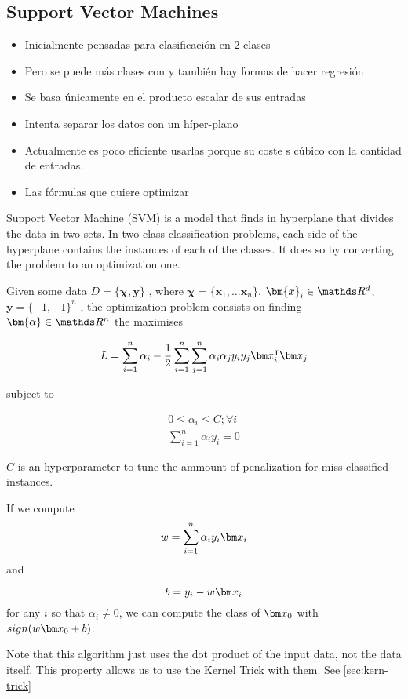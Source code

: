   \subsection{Support Vector Machines}
  \begin{note}
    \begin{itemize}
      \item Inicialmente pensadas para clasificación en 2 clases
      \item Pero se puede más clases con  y también hay
      formas de hacer regresión
      \item Se basa únicamente en el producto escalar de sus entradas
      \item Intenta separar los datos con un híper-plano
      \item Actualmente es poco eficiente usarlas porque su coste s cúbico
      con la cantidad de entradas.
      \item Las fórmulas que quiere optimizar
    \end{itemize}
  \end{note}

  \begin{pre-delivery}
    Support Vector Machine (SVM) is a model that finds in hyperplane that
    divides the data in two sets. In two-class classification problems, each
    side of the hyperplane contains the instances of each of the classes.
    It does so by converting the problem to an optimization one.

    Given some data
    $D = \{\bm{\chi}, \bm{y}\}$
    , where
    $\bm{\chi} = \{\bm{x}_1, \ldots \bm{x}_n\}$, $\bm{x}_i \in \reals^d$, $\bm{y} = \{-1, +1\}^n$
    , the optimization problem consists on finding $\bm{\alpha} \in \reals^n$
    the maximises

\begin{equation}
  L = \sum_{i = 1}^n\alpha_i -\frac{1}{2}\sum_{i = 1}^n\sum_{j = 1}^n\alpha_i\alpha_jy_iy_j\vx_i^\transp\vx_j
\end{equation}

subject to

\begin{align}
  0 \leq \alpha_i \leq C; \forall i\\
  \sum_{i = 1}^n \alpha_iy_i = 0
\end{align}

$C$ is an hyperparameter to tune the ammount of penalization for miss-classified
instances.

If we compute
\begin{equation}
  w = \sum_{i = 1}^n\alpha_iy_i\vx_i
\end{equation}
and

\begin{equation}
  b = y_i - w\vx_i
\end{equation}
for any $i$ so that $\alpha_i \neq 0$, we can compute the class of $\vx_0$ with
$sign(w\vx_0 + b)$.

Note that this algorithm just uses the dot product of the input data, not the
data itself. This property allows us to use the Kernel Trick with them.
See \ref{sec:kern-trick}

\end{pre-delivery}


